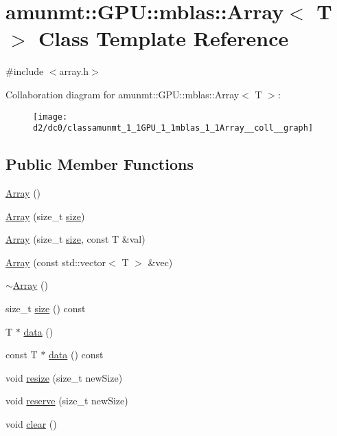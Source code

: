 \hypertarget{classamunmt_1_1GPU_1_1mblas_1_1Array}{}\section{amunmt\+:\+:G\+PU\+:\+:mblas\+:\+:Array$<$ T $>$ Class Template Reference}
\label{classamunmt_1_1GPU_1_1mblas_1_1Array}


{\ttfamily \#include $<$array.\+h$>$}



Collaboration diagram for amunmt\+:\+:G\+PU\+:\+:mblas\+:\+:Array$<$ T $>$\+:
\nopagebreak
\begin{figure}[H]
\begin{center}
\leavevmode
\texttt{[image: d2/dc0/classamunmt\_1\_1GPU\_1\_1mblas\_1\_1Array\_\_coll\_\_graph]}
\end{center}
\end{figure}
\subsection*{Public Member Functions}
\begin{DoxyCompactItemize}
\item 
\hyperlink{classamunmt_1_1GPU_1_1mblas_1_1Array_a501b947b592228c9245db2de1b888e7c}{Array} ()
\item 
\hyperlink{classamunmt_1_1GPU_1_1mblas_1_1Array_ac45fd24a2490f07d91407cfb75534f14}{Array} (size\+\_\+t \hyperlink{classamunmt_1_1GPU_1_1mblas_1_1Array_a904061864a097bb4e00227c00216fb38}{size})
\item 
\hyperlink{classamunmt_1_1GPU_1_1mblas_1_1Array_a40ec3bfface5916ccba7d197f5451873}{Array} (size\+\_\+t \hyperlink{classamunmt_1_1GPU_1_1mblas_1_1Array_a904061864a097bb4e00227c00216fb38}{size}, const T \&val)
\item 
\hyperlink{classamunmt_1_1GPU_1_1mblas_1_1Array_af41e6ca82ec8fe42e11c3a59f7b13464}{Array} (const std\+::vector$<$ T $>$ \&vec)
\item 
\hyperlink{classamunmt_1_1GPU_1_1mblas_1_1Array_a74ca79cbf8d528450cece797953a14ff}{$\sim$\+Array} ()
\item 
size\+\_\+t \hyperlink{classamunmt_1_1GPU_1_1mblas_1_1Array_a904061864a097bb4e00227c00216fb38}{size} () const 
\item 
T $\ast$ \hyperlink{classamunmt_1_1GPU_1_1mblas_1_1Array_a4034555b63c429f5f3113e7297094861}{data} ()
\item 
const T $\ast$ \hyperlink{classamunmt_1_1GPU_1_1mblas_1_1Array_a4dfaf4ea712df2f99a07261da03b6810}{data} () const 
\item 
void \hyperlink{classamunmt_1_1GPU_1_1mblas_1_1Array_ac5a8bd146e017b8bacd499053ca159cb}{resize} (size\+\_\+t new\+Size)
\item 
void \hyperlink{classamunmt_1_1GPU_1_1mblas_1_1Array_a82a366e0d0ea82a50ab46497edf112e1}{reserve} (size\+\_\+t new\+Size)
\item 
void \hyperlink{classamunmt_1_1GPU_1_1mblas_1_1Array_ab5dba7376988356cae89a636e462da24}{clear} ()
\end{DoxyCompactItemize}
